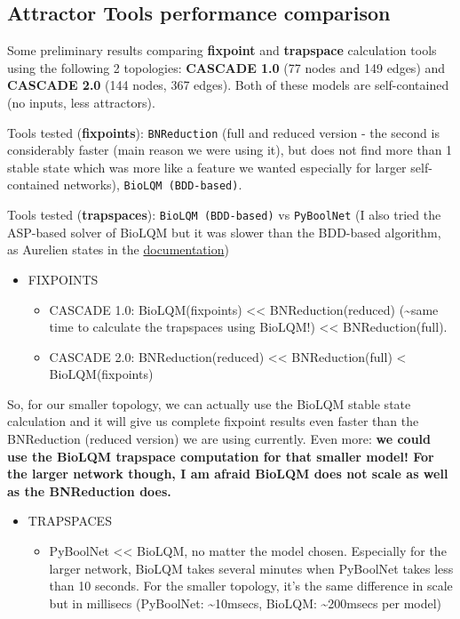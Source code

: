\documentclass[
  12pt,
]{book}
\providecommand{\tightlist}{%
  \setlength{\itemsep}{0pt}\setlength{\parskip}{0pt}}
\begin{document}
\hypertarget{attrToolCmp}{%
\subsection{Attractor Tools performance comparison}\label{attrToolCmp}}

Some preliminary results comparing \textbf{fixpoint} and \textbf{trapspace} calculation tools using the following 2 topologies: \textbf{CASCADE 1.0} (77 nodes and 149 edges) and \textbf{CASCADE 2.0} (144 nodes, 367 edges). Both of these models are self-contained (no inputs, less attractors).

Tools tested (\textbf{fixpoints}): \texttt{BNReduction} (full and reduced version - the second is considerably faster (main reason we were using it), but does not find more than 1 stable state which was more like a feature we wanted especially for larger self-contained networks), \texttt{BioLQM\ (BDD-based)}.

Tools tested (\textbf{trapspaces}): \texttt{BioLQM\ (BDD-based)} vs \texttt{PyBoolNet} (I also tried the ASP-based solver of BioLQM but it was slower than the BDD-based algorithm, as Aurelien states in the \href{http://colomoto.org/biolqm/doc/tools-trapspace.html}{documentation})

\begin{itemize}
\tightlist
\item
  FIXPOINTS

  \begin{itemize}
  \tightlist
  \item
    CASCADE 1.0: BioLQM(fixpoints) \textless{}\textless{} BNReduction(reduced) (\textasciitilde{}same time to calculate the trapspaces using BioLQM!) \textless{}\textless{} BNReduction(full).
  \item
    CASCADE 2.0: BNReduction(reduced) \textless{}\textless{} BNReduction(full) \textless{} BioLQM(fixpoints)
  \end{itemize}
\end{itemize}

So, for our smaller topology, we can actually use the BioLQM stable state calculation and it will give us complete fixpoint results even faster than the BNReduction (reduced version) we are using currently. Even more: \textbf{we could use the BioLQM trapspace computation for that smaller model! For the larger network though, I am afraid BioLQM does not scale as well as the BNReduction does.}

\begin{itemize}
\tightlist
\item
  TRAPSPACES

  \begin{itemize}
  \tightlist
  \item
    PyBoolNet \textless{}\textless{} BioLQM, no matter the model chosen. Especially for the larger network, BioLQM takes several minutes when PyBoolNet takes less than 10 seconds. For the smaller topology, it's the same difference in scale but in millisecs (PyBoolNet: \textasciitilde{}10msecs, BioLQM: \textasciitilde{}200msecs per model)
  \end{itemize}
\end{itemize}
\end{document}
